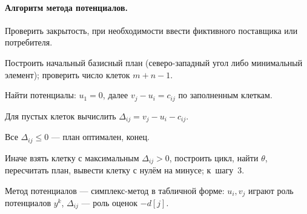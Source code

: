 \paragraph{Алгоритм метода потенциалов.}
\begin{csteps}
  \item Проверить закрытость, при необходимости ввести фиктивного поставщика
        или потребителя.
  \item Построить начальный базисный план (северо-западный угол либо
        минимальный элемент); проверить число клеток $m+n-1$.
  \item Найти потенциалы: $u_1 = 0$, далее $v_j - u_i = c_{ij}$ по заполненным
        клеткам.
  \item Для пустых клеток вычислить $\Delta_{ij} = v_j - u_i - c_{ij}$.
  \item Все $\Delta_{ij} \le 0$ — план оптимален, конец.
  \item Иначе взять клетку с максимальным $\Delta_{ij} > 0$, построить цикл,
        найти $\theta$, пересчитать план, вывести клетку с нулём на минусе;
        к~шагу~3.
\end{csteps}

Метод потенциалов — симплекс-метод в табличной форме: $u_i, v_j$ играют роль
потенциалов $y^k$, $\Delta_{ij}$ — роль оценок $-d[j]$.

